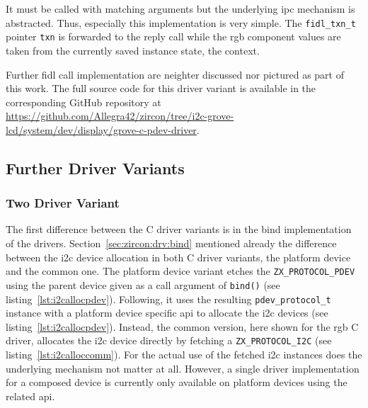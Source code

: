 It must be called with matching arguments but the underlying \ac{ipc} mechanism is abstracted.
Thus, especially this implementation is very simple.
The \texttt{fidl_txn_t} pointer \texttt{txn} is forwarded to the reply call while the \ac{rgb} component values are taken from the currently saved instance state, the context.

Further \ac{fidl} call implementation are neighter discussed nor pictured as part of this work.
The full source code for this driver variant is available in the corresponding GitHub repository at \url{https://github.com/Allegra42/zircon/tree/i2c-grove-lcd/system/dev/display/grove-c-pdev-driver}.


\subsection{Further Driver Variants}

\subsubsection*{Two Driver Variant} 
The first difference between the C driver variants is in the bind implementation of the drivers.
Section~\ref{sec:zircon:drv:bind} mentioned already the difference between the \ac{i2c} device allocation in both C driver variants, the platform device and the common one.
The platform device variant etches the \texttt{ZX_PROTOCOL_PDEV} using the parent device given as a call argument of \texttt{bind()} (see listing~\ref{lst:i2callocpdev}). 
Following, it uses the resulting \texttt{pdev_protocol_t} instance with a platform device specific \ac{api} to allocate the \ac{i2c} devices (see listing~\ref{lst:i2callocpdev}).
Instead, the common version, here shown for the \ac{rgb} C driver, allocates the \ac{i2c} device directly by fetching a \texttt{ZX_PROTOCOL_I2C} (see listing~\ref{lst:i2calloccomm}).
For the actual use of the fetched \ac{i2c} instances does the underlying mechanism not matter at all.
However, a single driver implementation for a composed device is currently only available on platform devices using the related \ac{api}.

